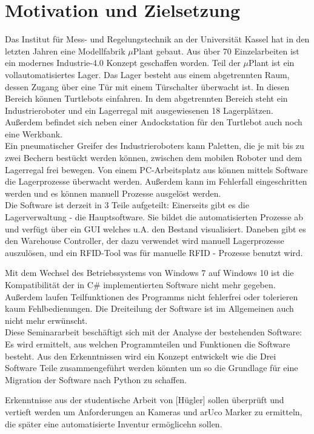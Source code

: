 
\chapter{Motivation und Zielsetzung}

    Das Institut für Mess- und Regelungstechnik an der Universität Kassel hat in den letzten Jahren eine Modellfabrik $\mu$Plant gebaut.
    Aus über 70 Einzelarbeiten ist ein modernes Industrie-4.0 Konzept geschaffen worden. Teil der $\mu$Plant ist ein vollautomatisiertes Lager.
    Das Lager besteht aus einem abgetrennten Raum, dessen Zugang über eine Tür mit einem Türschalter überwacht ist. In diesen Bereich können Turtlebots einfahren.
    In dem abgetrennten Bereich steht ein Industrieroboter und ein Lagerregal mit ausgewiesenen 18 Lagerplätzen. Außerdem befindet sich neben einer Andockstation für den Turtlebot auch noch eine Werkbank. \\

    Ein pneumatischer Greifer des Industrieroboters kann Paletten, die je mit bis zu zwei Bechern bestückt werden können, zwischen dem mobilen Roboter und dem Lagerregal frei bewegen.
    Von einem PC-Arbeitsplatz aus können mittels Software die Lagerprozesse überwacht werden. Außerdem kann im Fehlerfall eingeschritten werden und es können manuell Prozesse ausgelöst werden.\\

    Die Software ist derzeit in 3 Teile aufgeteilt: Einerseits gibt es die Lagerverwaltung - die Hauptsoftware. Sie bildet die automatisierten Prozesse ab und verfügt über ein GUI welches u.A. den Bestand visualisiert.
    Daneben gibt es den Warehouse Controller, der dazu verwendet wird manuell Lagerprozesse auszulösen, und ein RFID-Tool was für manuelle RFID - Prozesse benutzt wird.

    Mit dem Wechsel des Betriebssystems von Windows 7 auf Windows 10 ist die Kompatibilität der in C\# implementierten Software nicht mehr gegeben. Außerdem laufen Teilfunktionen des Programms nicht fehlerfrei oder tolerieren kaum Fehlbedienungen.
    Die Dreiteilung der Software ist im Allgemeinen auch nicht mehr erwünscht. \\

    Diese Seminararbeit beschäftigt sich mit der Analyse der bestehenden Software: Es wird ermittelt, aus welchen Programmteilen und Funktionen die Software besteht.
    Aus den Erkenntnissen wird ein Konzept entwickelt wie die Drei Software Teile zusammengeführt werden könnten um so die Grundlage für eine Migration der Software nach Python zu schaffen.

    Erkenntnisse aus der studentische Arbeit von [Hügler] sollen überprüft und vertieft werden um Anforderungen an Kameras und arUco Marker zu ermitteln, die später eine automatisierte Inventur ermöglicehn sollen.

